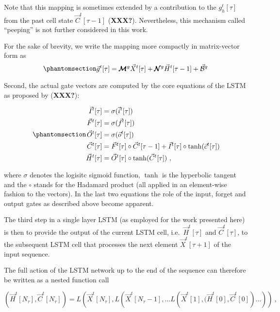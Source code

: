 \documentclass[
]{agujournal2019}
\begin{document}
Note that this mapping is sometimes extended by a contribution to the
\(g_h^t[\tau]\) from the past cell state \(\vec{C}^t[\tau-1]\)
(\textbf{XXX?}). Nevertheless, this mechanism called ``peeping'' is not
further considered in this work.

For the sake of brevity, we write the mapping more compactly in
matrix-vector form as
\begin{equation}\phantomsection\label{eq-LSTM-gates}{
\begin{aligned}
\vec{g}^t[\tau] = \pmb{\mathcal{M}}^{g}\vec{X}^t[\tau] + \pmb{\mathcal{N}}^{g}  \vec{H}^t[ \tau-1]+ \vec{\mathcal{B}}^g \,
\end{aligned}
}\end{equation}

Second, the actual gate vectors are computed by the core equations of
the LSTM as proposed by (\textbf{XXX?}):

\begin{equation}\phantomsection\label{eq-LSTM}{
\begin{aligned}
\vec{I}^t[\tau] &= \sigma(\vec{i}^t[\tau]) \\
\vec{F}^t[\tau] &= \sigma(\vec{f}^t[\tau]) \\
\vec{O}^t[\tau] &= \sigma(\vec{o}^t[\tau]) \\
\vec{C}^t[\tau] &= \vec{F}^t[\tau] \circ \vec{C}^t[\tau-1]  + \vec{I}^t[\tau] \circ \tanh(\vec{c}^t[\tau]) \\
\vec{H}^t[\tau]  &= \vec{O}^t[\tau] \circ \tanh(\vec{C}^t[\tau]) \ ,
\end{aligned}
}\end{equation}

where \(\sigma\) denotes the logisitc sigmoid function, \(\tanh\) is the
hyperbolic tangent and the \(\circ\) stands for the Hadamard product
(all applied in an element-wise fashion to the vectors). In the last two
equations the role of the input, forget and output gates as described
above become apparent.

The third step in a single layer LSTM (as employed for the work
presented here) is then to provide the output of the current LSTM cell,
i.e.~\(\vec{H}^t[\tau]\) and \(\vec{C}^t[\tau]\), to the subsequent LSTM
cell that processes the next element \(\vec{X}^t[\tau+1]\) of the input
sequence.

The full action of the LSTM network up to the end of the sequence can
therefore be written as a nested function call

\[
\left(\vec{H}^t[N_\tau], \vec{C}^t[N_\tau] \right) = L \left( \vec{X}^t[N_\tau], L \left( \vec{X}^t[N_\tau-1], \ldots L \left( \vec{X}^t[1], (\vec{H}^t[0], \vec{C}^t[0] \right) \ldots \right) \right) \ ,
\]
\end{document}
